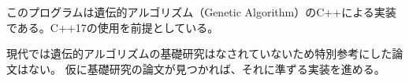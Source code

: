 このプログラムは遺伝的アルゴリズム（\+Genetic Algorithm）の\+C++による実装である。\+C++17の使用を前提としている。

現代では遺伝的アルゴリズムの基礎研究はなされていないため特別参考にした論文はない。 仮に基礎研究の論文が見つかれば、それに準ずる実装を進める。 